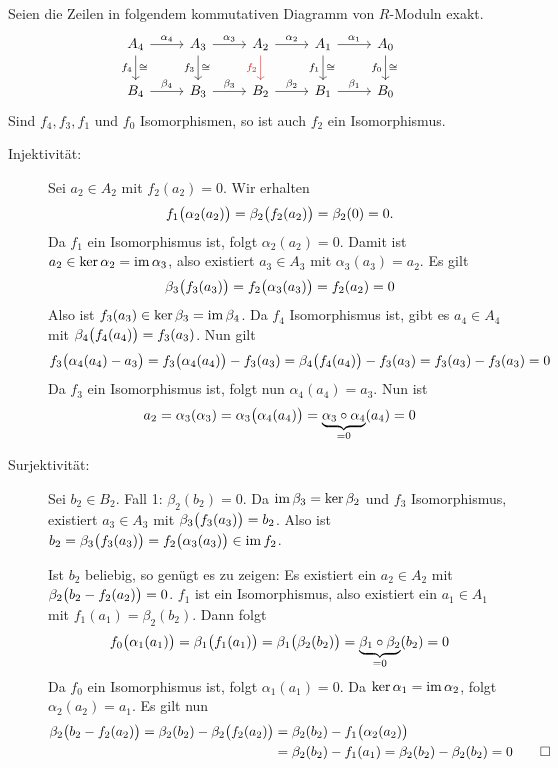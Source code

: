 \begin{lemma}[{name={Fünfer-Lemma}},label=lem:812]
	Seien die Zeilen in folgendem kommutativen Diagramm von $R$-Moduln exakt.
	\[
		\begin{tikzcd}
			A_4 \rar["\alpha_4"] \dar["f_4" swap, "\cong"] & A_3 \rar["\alpha_3"] \dar["f_3" swap, "\cong"] & A_2 \rar["\alpha_2"]  \dar[Firebrick3, "f_2" swap] & A_1 \rar["\alpha_1"] \dar["f_1" swap, "\cong"] & A_0  \dar["f_0" swap, "\cong"]\\
			B_4 \rar["\beta_4"] & B_3 \rar["\beta_3"] & B_2 \rar["\beta_2"] & B_1 \rar["\beta_1"] & B_0 
		\end{tikzcd}
	\]
	Sind $f_4, f_3, f_1$ und $f_0$ Isomorphismen, so ist auch $f_2$ ein Isomorphismus.
\end{lemma}
\begin{beweis}
	\begin{description}
		\item[Injektivität:] Sei $a_2 \in A_2$ mit $f_2(a_2)=0$. Wir erhalten 
		\[
			f_1 \enbrace[\big]{\alpha_2(a_2)} = \beta_2 \enbrace[\big]{f_2(a_2)} = \beta_2(0)=0. 
		\]
		Da $f_1$ ein Isomorphismus ist, folgt $\alpha_2(a_2)=0$. Damit ist $a_2 \in \ker \alpha_2 = \im \alpha_3$, also existiert $a_3 \in A_3$ mit $\alpha_3(a_3)= a_2$. Es gilt
		\[
			\beta_3 \enbrace[\big]{f_3(a_3)} = f_2 \enbrace[\big]{\alpha_3(a_3)} = f_2(a_2)=0  
		\]
		Also ist $f_3(a_3) \in \ker \beta_3 = \im \beta_4$. Da $f_4$ Isomorphismus ist, gibt es $a_4 \in A_4$ mit $\beta_4 \enbrace[\big]{f_4(a_4)} = f_3(a_3)$. Nun gilt
		\[
			f_3 \enbrace[\big]{\alpha_4(a_4)- a_3} = f_3 \enbrace[\big]{\alpha_4(a_4)} - f_3(a_3) = \beta_4 \enbrace[\big]{f_4(a_4)} - f_3(a_3) = f_3(a_3)- f_3(a_3) =0
		\]
		Da $f_3$ ein Isomorphismus ist, folgt nun $\alpha_4(a_4)=a_3$. Nun ist 
		\[
			a_2= \alpha_3(\alpha_3)= \alpha_3 \enbrace[\big]{\alpha_4(a_4)} = \underbrace{\alpha_3 \circ \alpha_4}_{=0}(a_4) =0
		\]
		\item[Surjektivität:] Sei $b_2 \in B_2$. Fall 1: $\beta_2(b_2)=0$. Da $\im \beta_3 = \ker \beta_2$ und $f_3$ Isomorphismus, existiert $a_3 \in A_3$ mit
		$\beta_3 \enbrace[\big]{f_3(a_3)} = b_2$. Also ist $b_2= \beta_3 \enbrace[\big]{f_3(a_3)} = f_2  \enbrace[\big]{\alpha_3(a_3)} \in \im f_2$. 
	
		Ist $b_2$ beliebig, so genügt es zu zeigen: Es existiert ein $a_2 \in A_2$ mit $\beta_2 \enbrace[\big]{b_2 - f_2(a_2)} =0$. $f_1$ ist ein Isomorphismus, also existiert 
		ein $ a_1 \in A_1$ mit $f_1(a_1) = \beta_2(b_2)$. Dann folgt
		\[
			f_0 \enbrace[\big]{\alpha_1(a_1)} = \beta_1 \enbrace[\big]{f_1(a_1)} = \beta_1 \enbrace[\big]{\beta_2(b_2)} = \underbrace{\beta_1 \circ \beta_2}_{=0} (b_2)=0
		\]
		Da $f_0$ ein Isomorphismus ist, folgt $\alpha_1(a_1)=0$. Da $\ker \alpha_1 = \im \alpha_2$, folgt $\alpha_2(a_2)=a_1$. Es gilt nun
		\begin{align*}
			\beta_2 \enbrace[\big]{b_2 - f_2(a_2)} = \beta_2(b_2) - \beta_2 \enbrace[\big]{f_2(a_2)} &= \beta_2(b_2) - f_1 \enbrace[\big]{\alpha_2(a_2)} \\ 
			&= \beta_2(b_2) - f_1(a_1)
			= \beta_2(b_2) - \beta_2(b_2) =0 \qedhere
		\end{align*}
	\end{description}
\end{beweis}

